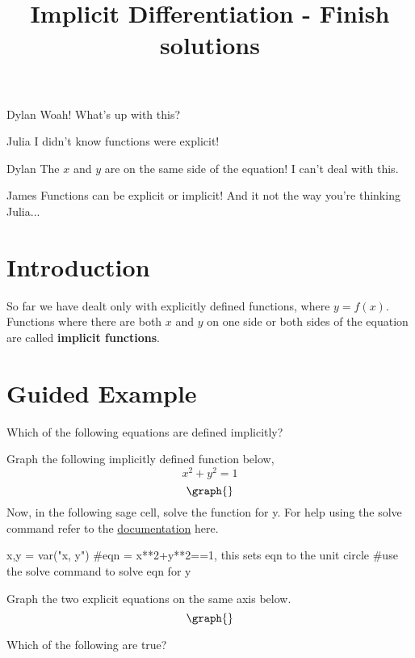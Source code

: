 \documentclass{ximera}
\title{Implicit Differentiation - Finish solutions}
\begin{document}
\maketitle
\begin{dialogue}
\item[Dylan] Woah! What's up with this?
\item[Julia] I didn't know functions were explicit!
\item[Dylan] The $x$ and $y$ are on the same side of the equation! I can't deal with this.
\item[James] Functions can be explicit or implicit! And it not the way you're thinking Julia...
\end{dialogue}
\section{Introduction}
So far we have dealt only with explicitly defined functions, where $y=f(x)$.  Functions where there are both $x$ and $y$ on one side or both sides of the equation are called \textbf{implicit functions}.
\section{Guided Example}
\begin{question}
Which of the following equations are defined implicitly?
\begin{selectAll}
\end{selectAll}
\end{question}
Graph the following implicitly defined function below, $$x^2+y^2=1$$
\[
\graph{}
\]
Now, in the following sage cell, solve the function for y. For help using the solve command refer to the \href{http://doc.sagemath.org/html/en/tutorial/tour_algebra.html#solving-equations}{documentation} here.
\begin{onlineOnly}
\begin{sageCell}
x,y = var("x, y")
#eqn = x**2+y**2==1, this sets eqn to the unit circle
#use the solve command to solve eqn for y
\end{sageCell}
\end{onlineOnly}
Graph the two explicit equations on the same axis below.
\[
\graph{}
\]
\begin{question}
Which of the following are true?
\begin{selectAll}
\end{selectAll}
\end{question}
\end{document}

